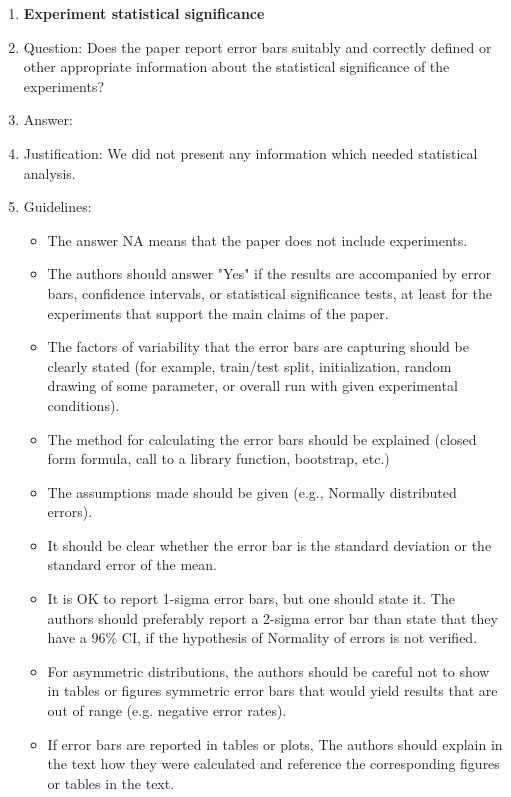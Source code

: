 \documentclass{article}
\begin{document}
\begin{enumerate}
\item {\bf Experiment statistical significance}
    \item[] Question: Does the paper report error bars suitably and correctly defined or other appropriate information about the statistical significance of the experiments?
    \item[] Answer: \answerNA{} %
    \item[] Justification: We did not present any information which needed statistical analysis.
    \item[] Guidelines:
    \begin{itemize}
        \item The answer NA means that the paper does not include experiments.
        \item The authors should answer "Yes" if the results are accompanied by error bars, confidence intervals, or statistical significance tests, at least for the experiments that support the main claims of the paper.
        \item The factors of variability that the error bars are capturing should be clearly stated (for example, train/test split, initialization, random drawing of some parameter, or overall run with given experimental conditions).
        \item The method for calculating the error bars should be explained (closed form formula, call to a library function, bootstrap, etc.)
        \item The assumptions made should be given (e.g., Normally distributed errors).
        \item It should be clear whether the error bar is the standard deviation or the standard error of the mean.
        \item It is OK to report 1-sigma error bars, but one should state it. The authors should preferably report a 2-sigma error bar than state that they have a 96\% CI, if the hypothesis of Normality of errors is not verified.
        \item For asymmetric distributions, the authors should be careful not to show in tables or figures symmetric error bars that would yield results that are out of range (e.g. negative error rates).
        \item If error bars are reported in tables or plots, The authors should explain in the text how they were calculated and reference the corresponding figures or tables in the text.
    \end{itemize}


\end{enumerate}
\end{document}
